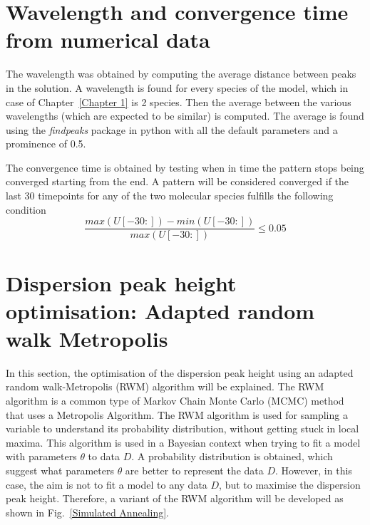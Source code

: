 \section{Wavelength and convergence time from numerical data}\label{Wavelength and convergence time from numerical data}
The wavelength was obtained by computing the average distance between peaks in the solution.
A wavelength is found for every species of the model, which in case of Chapter~\ref{Chapter 1} is 2 species.
Then the average between the various wavelengths (which are expected to be similar) is computed.
The average is found using the \textit{findpeaks} package in python with all the default parameters and a prominence of 0.5.

The convergence time is obtained by testing when in time the pattern stops being converged starting from the end.
A pattern will be considered converged if the last 30 timepoints for any of the two molecular species fulfills the following condition
\begin{equation}
    \frac{max(U[-30:]) - min(U[-30:])}{max(U[-30:])} \leq 0.05
\end{equation}

\section{Dispersion peak height optimisation: Adapted random walk Metropolis}\label{dispersion_peak_optimisation}
In this section, the optimisation of the dispersion peak height using an adapted random walk-Metropolis (RWM) algorithm will be explained.
The RWM algorithm is a common type of Markov Chain Monte Carlo (MCMC) method that uses a Metropolis Algorithm.
The RWM algorithm is used for sampling a variable to understand its probability distribution, without getting stuck in local maxima.
This algorithm is used in a Bayesian context when trying to fit a model with parameters $\theta$ to data $D$.
A probability distribution is obtained, which suggest what parameters $\theta$ are better to represent the data $D$.
However, in this case, the aim is not to fit a model to any data $D$, but to maximise the dispersion peak height.
Therefore, a variant of the RWM algorithm will be developed as shown in Fig.~\ref{Simulated Annealing}.

